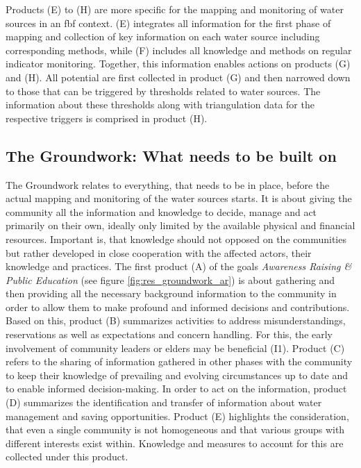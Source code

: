 Products (E) to (H) are more specific for the mapping and monitoring of water sources in an \acrshort{fbf} context. (E) integrates all information for the first phase of mapping and collection of key information on each water source including corresponding methods, while (F) includes all knowledge and methods on regular indicator monitoring. Together, this information enables actions on products (G) and (H). All potential  are first collected in product (G) and then narrowed down to those that can be triggered by thresholds related to water sources. The information about these thresholds along with triangulation data for the respective triggers is comprised in product (H).


\subsection{The Groundwork: What needs to be built on}\label{subsubsec:groundwork}
The Groundwork relates to everything, that needs to be in place, before the actual mapping and monitoring of the water sources starts. It is about giving the community all the information and knowledge to decide, manage and act primarily on their own, ideally only limited by the available physical and financial resources. Important is, that knowledge should not opposed on the communities but rather developed in close cooperation with the affected actors, their knowledge and practices. The first product (A) of the goals \textit{Awareness Raising \& Public Education} (see figure \ref{fig:res_groundwork_ar}) is about gathering and then providing all the necessary background information to the community in order to allow them to make profound and informed decisions and contributions. Based on this, product (B) summarizes activities to address misunderstandings, reservations as well as expectations and concern handling. For this, the early involvement of community leaders or elders may be beneficial (I1). Product (C) refers to the sharing of information gathered in other phases with the community to keep their knowledge of prevailing and evolving circumstances up to date and to enable informed decision-making. In order to act on the information, product (D) summarizes the identification and transfer of information about water management and saving opportunities. Product (E) highlights the consideration, that even a single community is not homogeneous and that various groups with different interests exist within. Knowledge and measures to account for this are collected under this product.\newline

